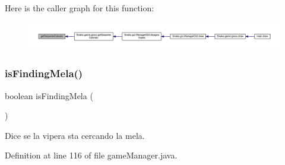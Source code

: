 Here is the caller graph for this function\+:
\nopagebreak
\begin{figure}[H]
\begin{center}
\leavevmode
\includegraphics[width=350pt]{class_snake_1_1game_1_1utility_1_1game_manager_adf69d52c2b16c0b681a384f734f9dd0f_icgraph}
\end{center}
\end{figure}
\mbox{\label{class_snake_1_1game_1_1utility_1_1game_manager_ad36cea66da3e5e8f3a9fdd8decd6f70b}} 
\subsubsection{\texorpdfstring{is\+Finding\+Mela()}{isFindingMela()}}
{\footnotesize\ttfamily boolean is\+Finding\+Mela (\begin{DoxyParamCaption}{ }\end{DoxyParamCaption})}



Dice se la vipera sta cercando la mela. 



Definition at line 116 of file game\+Manager.\+java.

